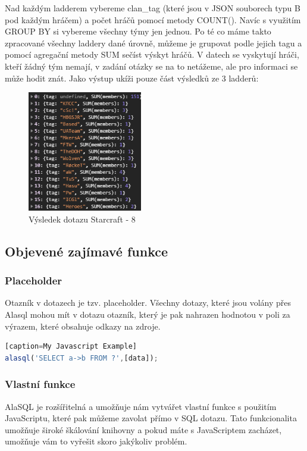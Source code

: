 \documentclass[a4, titlepage]{article}
\begin{document}
Nad každým ladderem vybereme clan\_tag (které jsou v JSON souborech typu B pod každým hráčem) a počet hráčů pomocí metody COUNT(). Navíc s využitím GROUP BY si vybereme všechny týmy jen jednou.
Po té co máme takto zpracované všechny laddery dané úrovně, můžeme je grupovat podle jejich tagu a pomocí agregační metody SUM sečíst výskyt hráčů. V datech se vyskytují hráči, kteří žádný tým nemají, v zadání otázky se na to netážeme, ale pro informaci se může hodit znát. Jako výstup ukíži pouze část výsledků ze 3 ladderů:
\begin{figure}[h]
    \centering
    \includegraphics[width=5cm]{S8}
    \caption{Výsledek dotazu Starcraft - 8}
\end{figure} 
\newpage

\subsection{Objevené zajímavé funkce}
\subsubsection*{Placeholder}
Otazník v dotazech je tzv. placeholder. Všechny dotazy, které jsou volány přes Alasql mohou mít v dotazu otazník, který je pak nahrazen hodnotou v poli za výrazem, které obsahuje odkazy na zdroje.

\begin{lstlisting}[language=JavaScript][caption=My Javascript Example]
alasql('SELECT a->b FROM ?',[data]);
\end{lstlisting}

\subsubsection*{Vlastní funkce}
AlaSQL je rozšířitelná a umožňuje nám vytvářet vlastní funkce s použitím JavaScriptu, které pak můžeme zavolat přímo v SQL dotazu. Tato funkcionalita umožňuje široké škálování knihovny a pokud máte s JavaScriptem zacházet, umožňuje vám to vyřešit skoro jakýkoliv problém.
\end{document}
